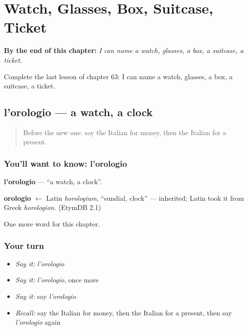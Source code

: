 
\chapter{Watch, Glasses, Box, Suitcase, Ticket}
\label{ch:it-watch-glasses-box-suitcase-ticket}

\begin{chapteropening}
\textbf{By the end of this chapter:} \emph{I can name a watch, glasses, a box, a suitcase, a ticket.}

Complete the last lesson of chapter 63: I can name a watch, glasses, a box, a suitcase, a ticket.
\end{chapteropening}

\section[l'orologio]{l'orologio — a watch, a clock}

\label{lesson:IT-C63-orologio}



\begin{quote}
Before the new one: say the Italian for money, then the Italian for a present.
\end{quote}

\subsection*{You'll want to know: l'orologio}
\textbf{l'orologio} — \textquotedblleft{}a watch, a clock\textquotedblright{}.

\begin{cousinweb}
\textbf{orologio} $\leftarrow$ Latin \emph{horologium}, \textquotedblleft{}sundial, clock\textquotedblright{} — inherited; Latin took it from Greek \emph{horologion}. (EtymDB 2.1)
\end{cousinweb}

\begin{grammarlens}[title={What you've built}]
One more word for this chapter.
\end{grammarlens}

\subsection*{Your turn}
\begin{itemize}
\raggedright
  \item \emph{Say it:} \emph{l'orologio}
  \item \emph{Say it:} \emph{l'orologio}, once more
  \item \emph{Say it:} say \emph{l'orologio}
  \item \emph{Recall:} say the Italian for money, then the Italian for a present, then say \emph{l'orologio} again
\end{itemize}

